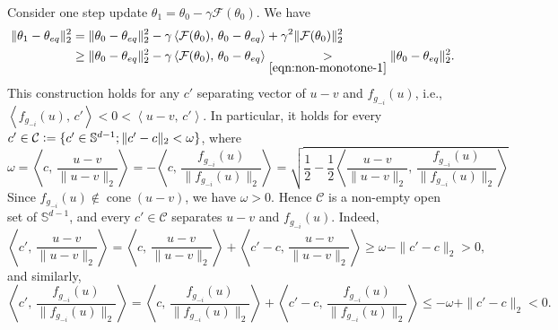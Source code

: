 \documentclass[twoside,11pt]{article}
\newcommand{\F}{\mathcal{F}}
\providecommand{\iprod}[2]{\ensuremath{\left\langle #1,\,#2  \right\rangle}}
\begin{document}
    Consider one step update $\theta_1 = \theta_0 - \gamma \F(\theta_0)$. We have
    \begin{align*}
        \| \theta_1 - \theta_{eq} \|_2^2 & = \| \theta_0 - \theta_{eq}\|_2^2 - \gamma \iprod{\F(\theta_0)}{\theta_0 - \theta_{eq}} + \gamma^2 \| \F(\theta_0) \|_2^2 \\
        & \geq \| \theta_0 - \theta_{eq} \|_2^2 - \gamma \iprod{\F(\theta_0)}{\theta_0 - \theta_{eq}} \underset{\eqref{eqn:non-monotone-1}}{>} \| \theta_0 - \theta_{eq} \|_2^2.
    \end{align*} 
    This construction holds for any $c'$ separating vector of $u-v$ and $f_{g_{-i}}(u)$, i.e., $\iprod{f_{g_{-i}}(u)}{c'} < 0 <\iprod{u - v}{c'}$. 
    In particular, it holds for every $c' \in \mathcal{C} \vcentcolon= \{c' \in \mathbb{S}^{d-1}; \|c'-c\|_2 < \omega \}$, where 
    \begin{equation*}
        \omega 
        = \iprod{c}{\frac{u - v}{\| u - v \|_2}} 
        = - \iprod{c}{\frac{f_{g_{-i}}(u) }{\| f_{g_{-i}}(u) \|_2}}
        = \sqrt{\frac{1}{2} -  \frac{1}{2}\iprod{\frac{u - v}{\| u - v \|_2}}{\frac{f_{g_{-i}}(u) }{\| f_{g_{-i}}(u) \|_2}}} 
    \end{equation*}
    Since $f_{g_{-i}}(u) \not \in \operatorname{cone}(u-v)$, we have $\omega > 0$. 
    Hence $\mathcal{C}$ is a non-empty open set of $\mathbb{S}^{d-1}$, and every $c' \in \mathcal{C}$ separates $u-v$ and $f_{g_{-i}}(u)$. 
    Indeed,
    \begin{equation*}
        \iprod{c'}{\frac{u - v}{\| u - v \|_2}} = \iprod{c}{\frac{u - v}{\| u - v \|_2}} + \iprod{c'-c}{\frac{u - v}{\| u - v \|_2}} 
        \geq \omega - \|c'-c\|_2 
        > 0,
    \end{equation*}
    and similarly, 
    \begin{equation*}
        \iprod{c'}{\frac{f_{g_{-i}}(u) }{\| f_{g_{-i}}(u) \|_2}} = \iprod{c}{\frac{f_{g_{-i}}(u) }{\| f_{g_{-i}}(u) \|_2}} + \iprod{c'-c}{\frac{f_{g_{-i}}(u) }{\| f_{g_{-i}}(u) \|_2}} 
        \leq -\omega + \|c'-c\|_2 
        < 0. \tag*{\BlackBox}
    \end{equation*}
\end{document}
